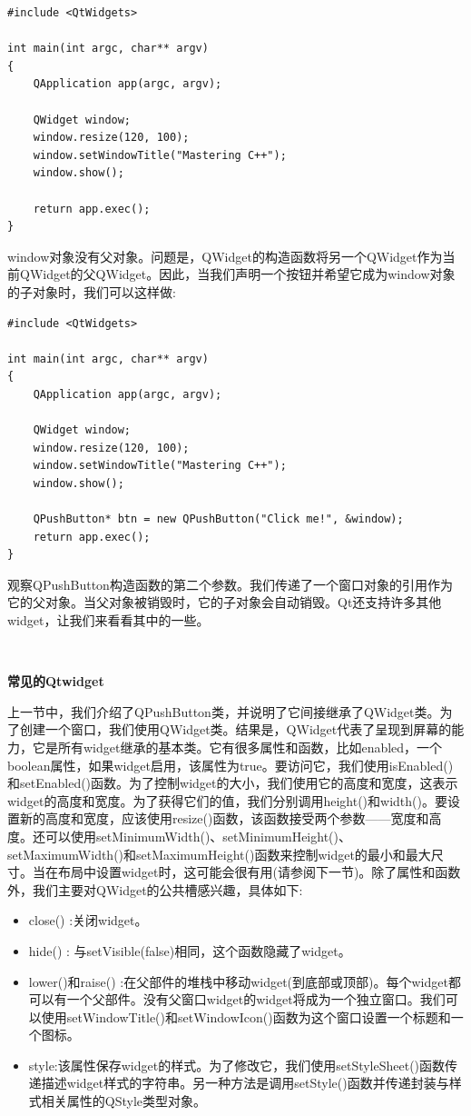 \begin{lstlisting}[caption={}]
#include <QtWidgets>

int main(int argc, char** argv)
{
	QApplication app(argc, argv);
	
	QWidget window;
	window.resize(120, 100);
	window.setWindowTitle("Mastering C++");
	window.show();
	
	return app.exec();
}
\end{lstlisting}

window对象没有父对象。问题是，QWidget的构造函数将另一个QWidget作为当前QWidget的父QWidget。因此，当我们声明一个按钮并希望它成为window对象的子对象时，我们可以这样做: \par

\begin{lstlisting}[caption={}]
#include <QtWidgets>

int main(int argc, char** argv)
{
	QApplication app(argc, argv);
	
	QWidget window;
	window.resize(120, 100);
	window.setWindowTitle("Mastering C++");
	window.show();
	
	QPushButton* btn = new QPushButton("Click me!", &window);
	return app.exec();
}
\end{lstlisting}

观察QPushButton构造函数的第二个参数。我们传递了一个窗口对象的引用作为它的父对象。当父对象被销毁时，它的子对象会自动销毁。Qt还支持许多其他widget，让我们来看看其中的一些。 \par

\noindent\textbf{}\ \par
\textbf{常见的Qtwidget} \ \par
上一节中，我们介绍了QPushButton类，并说明了它间接继承了QWidget类。为了创建一个窗口，我们使用QWidget类。结果是，QWidget代表了呈现到屏幕的能力，它是所有widget继承的基本类。它有很多属性和函数，比如enabled，一个boolean属性，如果widget启用，该属性为true。要访问它，我们使用isEnabled()和setEnabled()函数。为了控制widget的大小，我们使用它的高度和宽度，这表示widget的高度和宽度。为了获得它们的值，我们分别调用height()和width()。要设置新的高度和宽度，应该使用resize()函数，该函数接受两个参数——宽度和高度。还可以使用setMinimumWidth()、setMinimumHeight()、setMaximumWidth()和setMaximumHeight()函数来控制widget的最小和最大尺寸。当在布局中设置widget时，这可能会很有用(请参阅下一节)。除了属性和函数外，我们主要对QWidget的公共槽感兴趣，具体如下: \par

\begin{itemize}
	\item close() :关闭widget。
	\item hide() : 与setVisible(false)相同，这个函数隐藏了widget。
	\item lower()和raise() :在父部件的堆栈中移动widget(到底部或顶部)。每个widget都可以有一个父部件。没有父窗口widget的widget将成为一个独立窗口。我们可以使用setWindowTitle()和setWindowIcon()函数为这个窗口设置一个标题和一个图标。
	\item style:该属性保存widget的样式。为了修改它，我们使用setStyleSheet()函数传递描述widget样式的字符串。另一种方法是调用setStyle()函数并传递封装与样式相关属性的QStyle类型对象。
\end{itemize}

